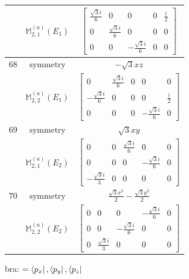 \documentclass[fleqn,8pt,landscape]{jsarticle}
\begin{document}
\begin{longtable}{ccc}
$  $ & $ \mathbb{M}_{2,1}^{(a)}(E_{1}) $ & $ \begin{bmatrix} \frac{\sqrt{3} i}{6} & 0 & 0 & 0 & \frac{i}{2} \\ 0 & \frac{\sqrt{3} i}{6} & 0 & 0 & 0 \\ 0 & 0 & - \frac{\sqrt{3} i}{6} & 0 & 0 \end{bmatrix} $ \\ \hline
$ 68 $ & $ \text{symmetry} $ & $ - \sqrt{3} x z $ \\
$  $ & $ \mathbb{M}_{2,2}^{(a)}(E_{1}) $ & $ \begin{bmatrix} 0 & \frac{\sqrt{3} i}{6} & 0 & 0 & 0 \\ - \frac{\sqrt{3} i}{6} & 0 & 0 & 0 & \frac{i}{2} \\ 0 & 0 & 0 & - \frac{\sqrt{3} i}{6} & 0 \end{bmatrix} $ \\ \hline
$ 69 $ & $ \text{symmetry} $ & $ \sqrt{3} x y $ \\
$  $ & $ \mathbb{M}_{2,1}^{(a)}(E_{2}) $ & $ \begin{bmatrix} 0 & 0 & \frac{\sqrt{3} i}{6} & 0 & 0 \\ 0 & 0 & 0 & - \frac{\sqrt{3} i}{6} & 0 \\ - \frac{\sqrt{3} i}{3} & 0 & 0 & 0 & 0 \end{bmatrix} $ \\ \hline
$ 70 $ & $ \text{symmetry} $ & $ \frac{\sqrt{3} x^{2}}{2} - \frac{\sqrt{3} y^{2}}{2} $ \\
$  $ & $ \mathbb{M}_{2,2}^{(a)}(E_{2}) $ & $ \begin{bmatrix} 0 & 0 & 0 & - \frac{\sqrt{3} i}{6} & 0 \\ 0 & 0 & - \frac{\sqrt{3} i}{6} & 0 & 0 \\ 0 & \frac{\sqrt{3} i}{3} & 0 & 0 & 0 \end{bmatrix} $ \\ \hline
\end{longtable}
bra: $=\bra{p_{x}}, \bra{p_{y}}, \bra{p_{z}}$
\end{document}
